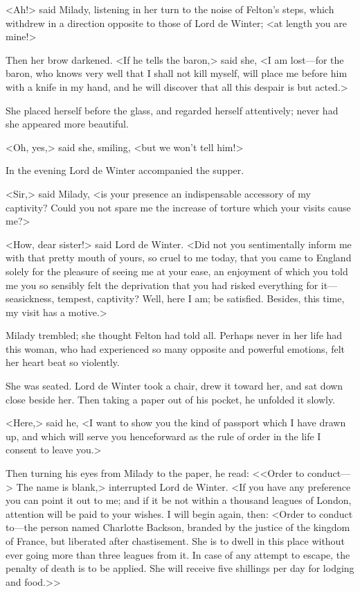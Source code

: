 <Ah!> said Milady, listening in her turn to the noise of Felton's steps, which withdrew in a direction opposite to those of Lord de Winter; <at length you are mine!> 

Then her brow darkened. <If he tells the baron,> said she, <I am lost---for the baron, who knows very well that I shall not kill myself, will place me before him with a knife in my hand, and he will discover that all this despair is but acted.> 

She placed herself before the glass, and regarded herself attentively; never had she appeared more beautiful. 

<Oh, yes,> said she, smiling, <but we won't tell him!> 

In the evening Lord de Winter accompanied the supper. 

<Sir,> said Milady, <is your presence an indispensable accessory of my captivity? Could you not spare me the increase of torture which your visits cause me?> 

<How, dear sister!> said Lord de Winter. <Did not you sentimentally inform me with that pretty mouth of yours, so cruel to me today, that you came to England solely for the pleasure of seeing me at your ease, an enjoyment of which you told me you so sensibly felt the deprivation that you had risked everything for it---seasickness, tempest, captivity? Well, here I am; be satisfied. Besides, this time, my visit has a motive.> 

Milady trembled; she thought Felton had told all. Perhaps never in her life had this woman, who had experienced so many opposite and powerful emotions, felt her heart beat so violently. 

She was seated. Lord de Winter took a chair, drew it toward her, and sat down close beside her. Then taking a paper out of his pocket, he unfolded it slowly. 

<Here,> said he, <I want to show you the kind of passport which I have drawn up, and which will serve you henceforward as the rule of order in the life I consent to leave you.> 

Then turning his eyes from Milady to the paper, he read: <<Order to conduct---> The name is blank,> interrupted Lord de Winter. <If you have any preference you can point it out to me; and if it be not within a thousand leagues of London, attention will be paid to your wishes. I will begin again, then: <Order to conduct to---the person named Charlotte Backson, branded by the justice of the kingdom of France, but liberated after chastisement. She is to dwell in this place without ever going more than three leagues from it. In case of any attempt to escape, the penalty of death is to be applied. She will receive five shillings per day for lodging and food.>>

